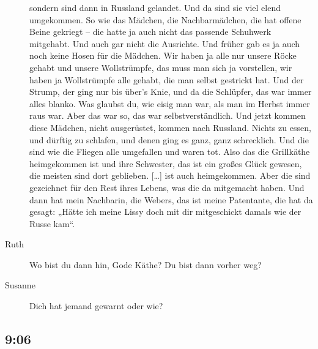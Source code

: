 \documentclass[ngerman,]{article}
\begin{document}
\begin{multicols}{2}
\begin{description}
sondern sind dann in Russland gelandet. Und da sind sie viel elend
umgekommen. So wie das Mädchen, die Nachbarmädchen, die hat offene Beine
gekriegt – die hatte ja auch nicht das passende Schuhwerk mitgehabt. Und
auch gar nicht die Ausrichte. Und früher gab es ja auch noch keine Hosen
für die Mädchen. Wir haben ja alle nur unsere Röcke gehabt und unsere
Wollstrümpfe, das muss man sich ja vorstellen, wir haben ja Wollstrümpfe
alle gehabt, die man selbst gestrickt hat. Und der Strump, der ging nur
bis über's Knie, und da die Schlüpfer, das war immer alles blanko. Was
glaubst du, wie eisig man war, als man im Herbst immer raus war. Aber
das war so, das war selbstverständlich. Und jetzt kommen diese Mädchen,
nicht ausgerüstet, kommen nach Russland. Nichts zu essen, und dürftig zu
schlafen, und denen ging es ganz, ganz schrecklich. Und die sind wie die
Fliegen alle umgefallen und waren tot. Also das die Grillkäthe
heimgekommen ist und ihre Schwester, das ist ein großes Glück gewesen,
die meisten sind dort geblieben. {[}\ldots{}{]} ist auch heimgekommen.
Aber die sind gezeichnet für den Rest ihres Lebens, was die da
mitgemacht haben. Und dann hat mein Nachbarin, die Webers, das ist meine
Patentante, die hat da gesagt: „Hätte ich meine Lissy doch mit dir
mitgeschickt damals wie der Russe kam“.
\item[Ruth]
Wo bist du dann hin, Gode Käthe? Du bist dann vorher weg?
\item[Susanne]
Dich hat jemand gewarnt oder wie?
\end{description}

\hypertarget{section-5}{%
\subsection{9:06}\label{section-5}}


\end{multicols}
\end{document}
